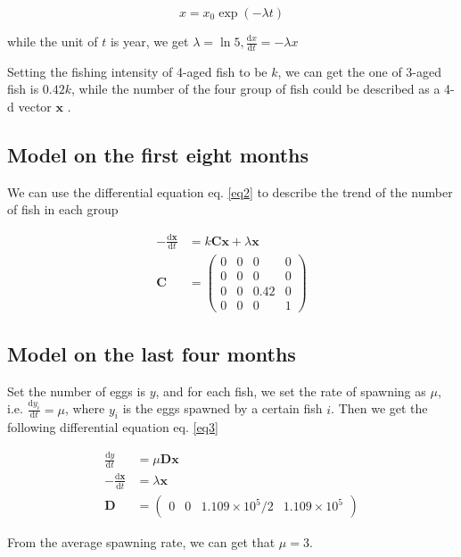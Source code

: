\documentclass{IEEEtran}
\begin{document}
\begin{equation}
    \label{eq1}
    x = x_0 \exp(-\lambda t)
\end{equation}

while the unit of $t$ is year, we get $\lambda = \ln 5, \frac{\mathrm dx}{\mathrm dt} = -\lambda x$

Setting the fishing intensity of 4-aged fish to be $k$, we can get the one of 3-aged fish is $0.42k$, while the number of the four group of fish could be described as a 4-d vector $\bm x$ .

\subsection{Model on the first eight months}

We can use the differential equation eq. \ref{eq2} to describe the trend of the number of fish in each group

\begin{align}
    \label{eq2}
    -\frac{\mathrm d \bm x}{\mathrm d t} &= k \pmb C \bm x + \lambda \bm x \\
    \pmb C &= \begin{pmatrix}0&0&0&0\\0&0&0&0\\0&0&0.42&0\\0&0&0&1\end{pmatrix}
\end{align}
\subsection{Model on the last four months}
Set the number of eggs is $y$, and for each fish, we set the rate of spawning as $\mu$, i.e. $\frac {\mathrm d y_i}{\mathrm d t} = \mu$, where $y_i$ is the eggs spawned by a certain fish $i$. Then we get the following differential equation eq. \ref{eq3}

\begin{align}
    \label{eq3}
    \frac {\mathrm d y}{\mathrm d t} &= \mu \pmb D \bm x\\
    -\frac{\mathrm d \bm x}{\mathrm d t} &=\lambda \bm x\\
    \pmb D &= \begin{pmatrix} 0 & 0 & 1.109\times10^5/2&1.109\times10^5\end{pmatrix}
\end{align}

From the average spawning rate, we can get that $\mu = 3$.
\end{document}
